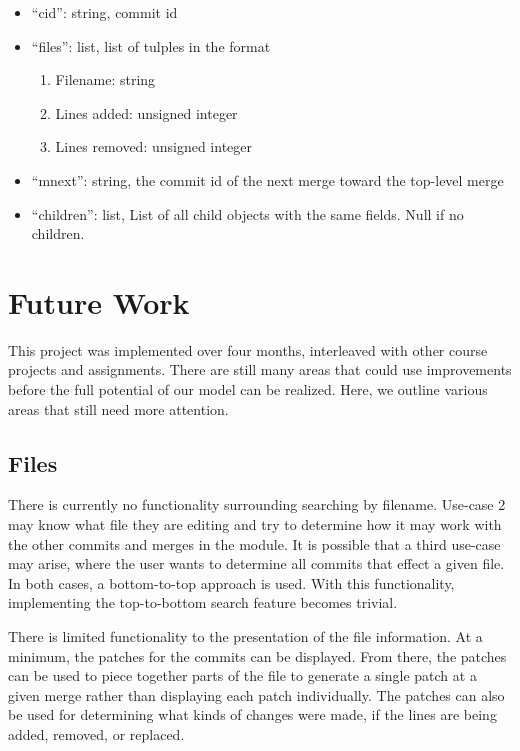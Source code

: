 \documentclass[conference, draftclsnofoot]{IEEEtran}
\begin{document}
\begin{itemize}
        \item ``cid'': string, commit id
        \item ``files'': list, list of tulples in the format
                \begin{enumerate}
                        \item Filename: string
                        \item Lines added: unsigned integer
                        \item Lines removed: unsigned integer
                \end{enumerate}
        \item ``mnext'': string, the commit id of the next merge toward the
                top-level merge
        \item ``children'': list, List of all child objects with the same
                fields. Null if no children.
\end{itemize}

\section{Future Work}
This project was implemented over four months, interleaved with other course
projects and assignments. There are still many areas that could use
improvements before the full potential of our model can be realized.
Here, we outline various areas that still need more attention.

\subsection{Files}
There is currently no functionality surrounding searching by filename. Use-case
2 may know what file they are editing and try to determine how it may work with
the other commits and merges in the module. It is possible that a third
use-case may arise, where the user wants to determine all commits that effect a
given file. In both cases, a bottom-to-top approach is used. With this
functionality, implementing the top-to-bottom search feature becomes trivial.

There is limited functionality to the presentation of the file information. At
a minimum, the patches for the commits can be displayed. From there, the
patches can be used to piece together parts of the file to generate a single
patch at a given merge rather than displaying each patch individually. The
patches can also be used for determining what kinds of changes were made, if
the lines are being added, removed, or replaced.
\end{document}
